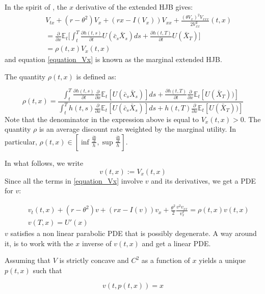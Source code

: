 \documentclass[11pt, psfig]{article}
\theoremstyle{definition}
\theoremstyle{remark}
\numberwithin{equation}{section}
\def\sE{\mathbb{E}}
\newcommand{\be}{\begin{equation}}
\newcommand{\ee}{\end{equation}}
\begin{document}
In the spirit of \cite{Na_Za1}, 
the $x$ derivative of the extended HJB gives:
\begin{eqnarray} \label{equation_Vx}
&&V_{tx}+(r-\theta^2)V_x+(rx-I(V_x))V_{xx}+\frac{(\theta V_x)^2V_{xxx}}{2V_{xx}^2}(t,x) \nonumber \\
&& =\frac{\partial}{\partial x}\sE_t \bigg[ \int_t^T \frac{\partial h(t,s)}{\partial t}U(\bar{c}_s\bar{X}_s) ds+\frac{\partial h(t,T)}{\partial t} U(\bar{X}_T) \bigg]\\
&& = \rho(t,x) V_x(t,x)
\end{eqnarray}
and equation \eqref{equation_Vx} is known as the marginal extended HJB.

The quantity $\rho(t,x)$ is defined as:



\begin{equation}\label{quotient_rho}
\rho(t,x)=\frac{  \int_t^T \frac{\partial h(t,s)}{\partial t} \frac{\partial }{\partial x}\sE_t[U(\bar{c}_s\bar{X}_s)] ds+\frac{\partial h(t,T)}{\partial t} \frac{\partial }{\partial x}\sE_t[U(\bar{X}_T))] }{  \int_t^T  h(t,s) \frac{\partial }{\partial x}\sE_t[U(\bar{c}_s\bar{X}_s)] ds+ h(t,T)\frac{\partial }{\partial x}\sE_t[U(\bar{X}_T))]}
\end{equation}
Note that the denominator in the expression above is equal to $V_x(t,x)>0$.
The quantity $\rho$ is an average discount rate weighted by the marginal utility.
In particular, $\rho(t,x) \in \left[\inf  \frac{\frac{\partial h}{\partial t}}{h}, \sup\frac{\frac{\partial h}{\partial t}}{h}\right]$.



In what follows, we write
\be
v(t,x) := V_x(t,x)
\ee
Since all the terms in \eqref{equation_Vx} involve $v$ and its derivatives, we get a PDE for $v$:

\begin{eqnarray}\label{PDE_v}
&&v_{t}(t,x)+(r-\theta^2)v+(rx-I(v))v_{x}+\frac{\theta^2}{2}\frac{v^2v_{xx}}{v_{x}^2}  =\rho(t,x) v(t,x)\\
&& v(T,x) = U'(x)
\end{eqnarray}
$v$ satisfies a non linear parabolic PDE that is possibly degenerate.
A way around it, is to work with the $x$ inverse of $v(t,x)$ and get a linear PDE.

Assuming that $V$ is strictly concave and $C^2$ as a function of $x$ yields a unique $p(t,x)$ such that

\begin{equation}\label{Vx_p}
v(t,p(t, x))=x
\end{equation}
\end{document}
